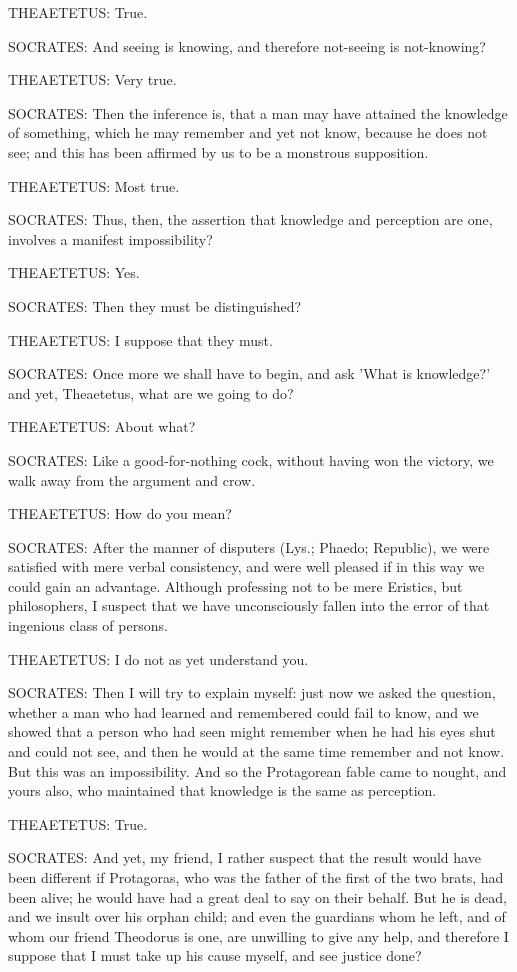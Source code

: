 THEAETETUS: True.

SOCRATES: And seeing is knowing, and therefore not-seeing is
not-knowing?

THEAETETUS: Very true.

SOCRATES: Then the inference is, that a man may have attained the
knowledge of something, which he may remember and yet not know, because
he does not see; and this has been affirmed by us to be a monstrous
supposition.

THEAETETUS: Most true.

SOCRATES: Thus, then, the assertion that knowledge and perception are
one, involves a manifest impossibility?

THEAETETUS: Yes.

SOCRATES: Then they must be distinguished?

THEAETETUS: I suppose that they must.

SOCRATES: Once more we shall have to begin, and ask 'What is knowledge?'
and yet, Theaetetus, what are we going to do?

THEAETETUS: About what?

SOCRATES: Like a good-for-nothing cock, without having won the victory,
we walk away from the argument and crow.

THEAETETUS: How do you mean?

SOCRATES: After the manner of disputers (Lys.; Phaedo; Republic), we
were satisfied with mere verbal consistency, and were well pleased if in
this way we could gain an advantage. Although professing not to be mere
Eristics, but philosophers, I suspect that we have unconsciously fallen
into the error of that ingenious class of persons.

THEAETETUS: I do not as yet understand you.

SOCRATES: Then I will try to explain myself: just now we asked the
question, whether a man who had learned and remembered could fail to
know, and we showed that a person who had seen might remember when he
had his eyes shut and could not see, and then he would at the same
time remember and not know. But this was an impossibility. And so the
Protagorean fable came to nought, and yours also, who maintained that
knowledge is the same as perception.

THEAETETUS: True.

SOCRATES: And yet, my friend, I rather suspect that the result would
have been different if Protagoras, who was the father of the first of
the two brats, had been alive; he would have had a great deal to say on
their behalf. But he is dead, and we insult over his orphan child; and
even the guardians whom he left, and of whom our friend Theodorus is
one, are unwilling to give any help, and therefore I suppose that I must
take up his cause myself, and see justice done?

